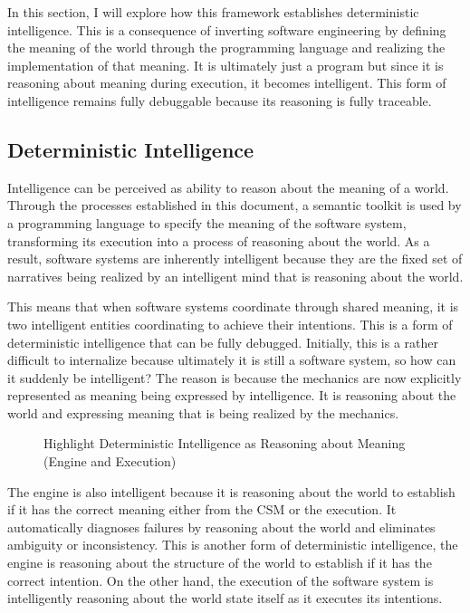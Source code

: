 In this section, I will explore how this framework establishes deterministic intelligence. This is a consequence of inverting software engineering by defining the meaning of the world through the programming language and realizing the implementation of that meaning. It is ultimately just a program but since it is reasoning about meaning during execution, it becomes intelligent. This form of intelligence remains fully debuggable because its reasoning is fully traceable.

\subsection{Deterministic Intelligence}

Intelligence can be perceived as ability to reason about the meaning of a world. Through the processes established in this document, a semantic toolkit is used by a programming language to specify the meaning of the software system, transforming its execution into a process of reasoning about the world. As a result, software systems are inherently intelligent because they are the fixed set of narratives being realized by an intelligent mind that is reasoning about the world.

This means that when software systems coordinate through shared meaning, it is two intelligent entities coordinating to achieve their intentions. This is a form of deterministic intelligence that can be fully debugged. Initially, this is a rather difficult to internalize because ultimately it is still a software system, so how can it suddenly be intelligent? The reason is because the mechanics are now explicitly represented as meaning being expressed by intelligence. It is reasoning about the world and expressing meaning that is being realized by the mechanics. 

\begin{figure}[htbp]
    \centering
    
    \caption{Highlight Deterministic Intelligence as Reasoning about Meaning (Engine and Execution)}
    \label{fig:deterministic_intelligence}
\end{figure}

The engine is also intelligent because it is reasoning about the world to establish if it has the correct meaning either from the CSM or the execution. It automatically diagnoses failures by reasoning about the world and eliminates ambiguity or inconsistency. This is another form of deterministic intelligence, the engine is reasoning about the structure of the world to establish if it has the correct intention. On the other hand, the execution of the software system is intelligently reasoning about the world state itself as it executes its intentions.

